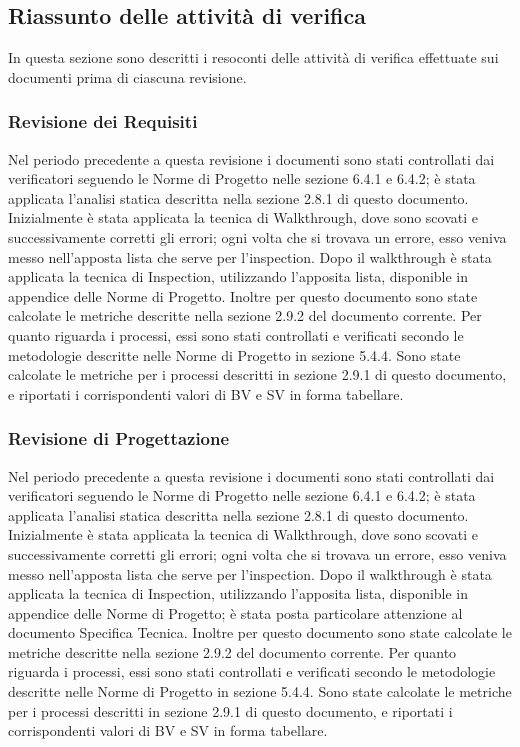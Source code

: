 \subsection{Riassunto delle attività di verifica}
In questa sezione sono descritti i resoconti delle attività di verifica effettuate sui documenti prima di ciascuna revisione.
\subsubsection{Revisione dei Requisiti}
Nel periodo precedente a questa revisione i documenti sono stati controllati dai verificatori seguendo le Norme di Progetto nelle sezione 6.4.1 e 6.4.2; è stata applicata l'analisi statica descritta nella sezione 2.8.1 di questo documento.
Inizialmente è stata applicata la tecnica di Walkthrough, dove sono scovati e successivamente corretti gli errori; ogni volta che si trovava un errore, esso veniva messo nell'apposta lista che serve per l'inspection.
Dopo il walkthrough è stata applicata la tecnica di Inspection, utilizzando l'apposita lista, disponible in appendice delle Norme di Progetto. Inoltre per questo documento sono state calcolate le metriche descritte nella sezione 2.9.2 del documento corrente.
Per quanto riguarda i processi, essi sono stati controllati e verificati secondo le metodologie descritte nelle Norme di Progetto in sezione 5.4.4. Sono state calcolate le metriche per i processi descritti in sezione 2.9.1 di questo documento, e riportati i corrispondenti valori di BV e SV in forma tabellare.
\subsubsection{Revisione di Progettazione}
Nel periodo precedente a questa revisione i documenti sono stati controllati dai verificatori seguendo le Norme di Progetto nelle sezione 6.4.1 e 6.4.2; è stata applicata l'analisi statica descritta nella sezione 2.8.1 di questo documento.
Inizialmente è stata applicata la tecnica di Walkthrough, dove sono scovati e successivamente corretti gli errori; ogni volta che si trovava un errore, esso veniva messo nell'apposta lista che serve per l'inspection.
Dopo il walkthrough è stata applicata la tecnica di Inspection, utilizzando l'apposita lista, disponible in appendice delle Norme di Progetto; è stata posta particolare attenzione al documento Specifica Tecnica. Inoltre per questo documento sono state calcolate le metriche descritte nella sezione 2.9.2 del documento corrente.
Per quanto riguarda i processi, essi sono stati controllati e verificati secondo le metodologie descritte nelle Norme di Progetto in sezione 5.4.4. Sono state calcolate le metriche per i processi descritti in sezione 2.9.1 di questo documento, e riportati i corrispondenti valori di BV e SV in forma tabellare.
